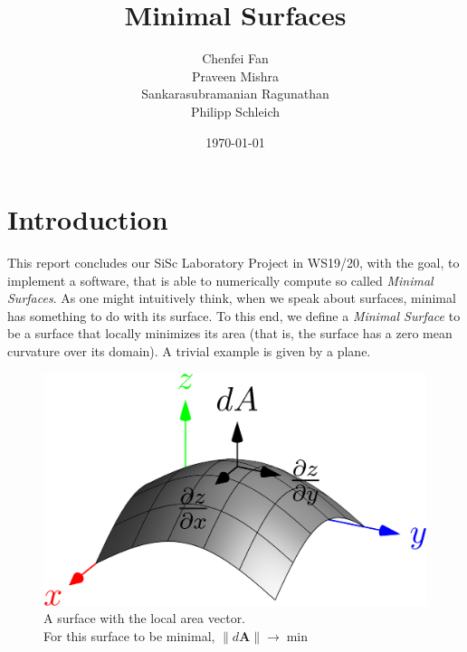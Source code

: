 \documentclass[11pt]{scrartcl}
\title{Minimal Surfaces}
\author{Chenfei Fan \quad 390189 \\  Praveen Mishra\quad 389850 \\ Sankarasubramanian Ragunathan\quad 389851\\ Philipp Schleich\quad 391779}
\date{\today \\ \vspace{0.9cm}}
\begin{document}
\maketitle

%
\clearpage
\protect \tableofcontents



\newpage
	
\onehalfspacing
\section{Introduction}
This report concludes our SiSc Laboratory Project in WS19/20, with the goal, to implement a software, that is able to numerically compute so called \emph{Minimal Surfaces}. As one might intuitively think, when we speak about surfaces, minimal has something to do with its surface. To this end, we define a \emph{Minimal Surface} to be a surface that locally minimizes its area (that is, the surface has a zero mean curvature over its domain). A trivial example is given by a plane. \cite{wiki:minsurf}

\begin{figure}[H]
	\centering
	\includegraphics[width=0.5\linewidth]{./figs/minsurfIntro.png}
	\caption{A surface with the local area vector.\\ For this surface to be minimal, $\lVert d\mathbf{A} \rVert \to \min $}
\end{figure}
\end{document}
